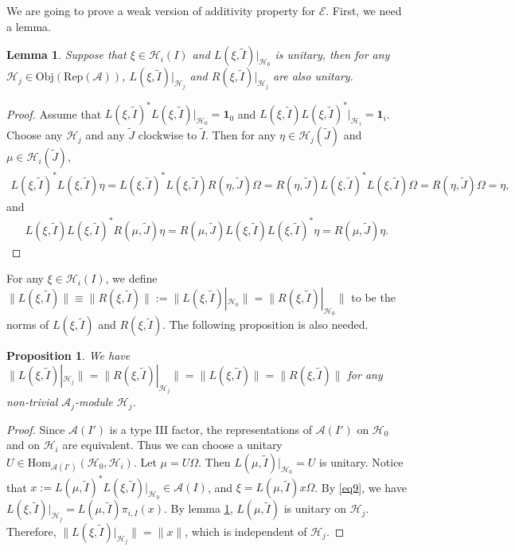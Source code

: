 \documentclass[12pt,a4paper]{article}
\theoremstyle{definition}
\theoremstyle{plain}
\newtheorem{pp}[df]{Proposition}
\newtheorem{lm}[df]{Lemma}
\newcommand{\mc}{\mathcal}
\newcommand{\wtd}{\widetilde}
\newcommand{\id}{\mathbf{1}}
\newcommand{\Hom}{\mathrm{Hom}}
\newcommand{\scr}{\mathscr}
\newcommand{\RepA}{\mathrm{Rep}(\mc A)}
\newcommand{\Obj}{\mathrm{Obj}}
\numberwithin{equation}{subsection}
\begin{document}
We are going to prove a weak version of additivity property for $\scr E$. First, we need a lemma.

\begin{lm}\label{lb6}
	Suppose that $\xi\in\mc H_i(I)$ and $L(\xi,\wtd I)|_{\mc H_0}$ is unitary, then for any $\mc H_j\in\Obj(\RepA)$, $L(\xi,\wtd I)|_{\mc H_j}$ and $R(\xi,\wtd I)|_{\mc H_j}$ are also unitary.
\end{lm}


\begin{proof}
	Assume that $L(\xi,\wtd I)^*L(\xi,\wtd I)|_{\mc H_0}=\id_0$ and  $L(\xi,\wtd I)L(\xi,\wtd I)^*|_{\mc H_i}=\id_i$. Choose any $\mc H_j$ and any $\wtd J$ clockwise to $\wtd I$. Then for any $\eta\in\mc H_j(\wtd J)$ and $\mu\in\mc H_i(\wtd J)$,
	\begin{align*}
	L(\xi,\wtd I)^*L(\xi,\wtd I)\eta=L(\xi,\wtd I)^*L(\xi,\wtd I)R(\eta,\wtd J)\Omega=R(\eta,\wtd J)L(\xi,\wtd I)^*L(\xi,\wtd I)\Omega=R(\eta,\wtd J)\Omega=\eta,
	\end{align*}
	and 
	\begin{align*}
	L(\xi,\wtd I)L(\xi,\wtd I)^*R(\mu,\wtd J)\eta=R(\mu,\wtd J)L(\xi,\wtd I)L(\xi,\wtd I)^*\eta=R(\mu,\wtd J)\eta.
	\end{align*}
\end{proof}

For any $\xi\in\mc H_i(I)$, we define $\lVert L(\xi,\wtd I) \lVert\equiv \lVert R(\xi,\wtd I) \lVert:=\lVert L(\xi,\wtd I)|_{\mc H_0} \lVert=\lVert R(\xi,\wtd I)|_{\mc H_0} \lVert$ to be the norms of $L(\xi,\wtd I)$ and $R(\xi,\wtd I)$.  \index{Lxi@$\lVert L(\xi,\wtd I) \lVert=\lVert R(\xi,\wtd I) \lVert$} The following proposition is also needed.


\begin{pp}\label{lb20}
We have $\lVert L(\xi,\wtd I)|_{\mc H_j} \lVert=\lVert R(\xi,\wtd I)|_{\mc H_j} \lVert=\lVert L(\xi,\wtd I)\lVert=\lVert R(\xi,\wtd I)\lVert$ for any non-trivial $\mc A_j$-module $\mc H_j$.
\end{pp}
\begin{proof}
Since $\mc A(I')$ is a type III factor, the representations of $\mc A(I')$ on $\mc H_0$ and on $\mc H_i$ are equivalent. Thus we can choose a unitary $U\in\Hom_{\mc A(I')}(\mc H_0,\mc H_i)$. Let $\mu=U\Omega$. Then $L(\mu,\wtd I)|_{\mc H_0}=U$ is unitary. Notice that   $x:=L(\mu,\wtd I)^*L(\xi,\wtd I)|_{\mc H_0}\in\mc A(I)$, and $\xi=L(\mu,\wtd I)x\Omega$. By \eqref{eq9}, we have $L(\xi,\wtd I)|_{\mc H_j}=L(\mu,\wtd I)\pi_{i,I}(x)$. By lemma \ref{lb6}, $L(\mu,\wtd I)$ is unitary on  $\mc H_j$. Therefore, $\lVert L(\xi,\wtd I)|_{\mc H_j} \lVert=\lVert x\lVert$, which is independent of $\mc H_j$.
\end{proof}
\end{document}
